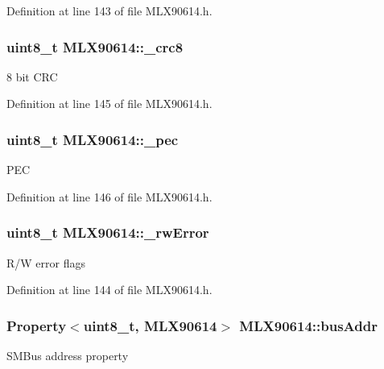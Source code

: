 Definition at line 143 of file M\-L\-X90614.\-h.

\hypertarget{class_m_l_x90614_add210d34992507e8ccb753a040b14395}{
\subsubsection[{\-\_\-crc8}]{\setlength{\rightskip}{0pt plus 5cm}uint8\-\_\-t M\-L\-X90614\-::\-\_\-crc8\hspace{0.3cm}{\ttfamily [private]}}}\label{class_m_l_x90614_add210d34992507e8ccb753a040b14395}
8 bit C\-R\-C 

Definition at line 145 of file M\-L\-X90614.\-h.

\hypertarget{class_m_l_x90614_a2526978eb988a8712baee6dca596be15}{
\subsubsection[{\-\_\-pec}]{\setlength{\rightskip}{0pt plus 5cm}uint8\-\_\-t M\-L\-X90614\-::\-\_\-pec\hspace{0.3cm}{\ttfamily [private]}}}\label{class_m_l_x90614_a2526978eb988a8712baee6dca596be15}
P\-E\-C 

Definition at line 146 of file M\-L\-X90614.\-h.

\hypertarget{class_m_l_x90614_a8c203cc9359c283d07682ba7dbcc5de3}{
\subsubsection[{\-\_\-rw\-Error}]{\setlength{\rightskip}{0pt plus 5cm}uint8\-\_\-t M\-L\-X90614\-::\-\_\-rw\-Error\hspace{0.3cm}{\ttfamily [private]}}}\label{class_m_l_x90614_a8c203cc9359c283d07682ba7dbcc5de3}
R/\-W error flags 

Definition at line 144 of file M\-L\-X90614.\-h.

\hypertarget{class_m_l_x90614_a66d99dc5778b514038c0fa5e25a722f1}{
\subsubsection[{bus\-Addr}]{\setlength{\rightskip}{0pt plus 5cm}Property$<$uint8\-\_\-t, {\bf M\-L\-X90614}$>$ M\-L\-X90614\-::bus\-Addr}}\label{class_m_l_x90614_a66d99dc5778b514038c0fa5e25a722f1}
S\-M\-Bus address property 


